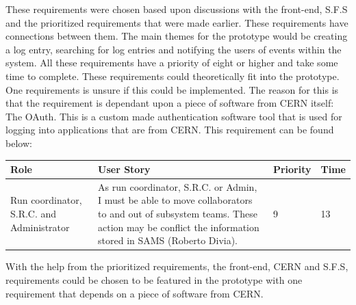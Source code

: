 \documentclass[paper=a4, fontsize=11pt,twoside]{scrartcl}	%
\begin{document}
These requirements were chosen based upon discussions with the front-end, S.F.S and the prioritized requirements that were made earlier. These requirements have connections between them. The main themes for the prototype would be creating a log entry, searching for log entries and notifying the users of events within the system. All these requirements have a priority of eight or higher and take some time to complete. These requirements could theoretically fit into the prototype. One requirements is unsure if this could be implemented. The reason for this is that the requirement is dependant upon a piece of software from CERN itself: The OAuth. This is a custom made authentication software tool that is used for logging into applications that are from CERN. This requirement can be found below: \\

\begin{longtable}{ | p{3cm} | p{8cm} | p{1.5cm} | l |}
\hline
Role & User Story & Priority & Time \\ \hline
Run coordinator, S.R.C. and Administrator &  As run coordinator, S.R.C. or Admin, I must be able to move collaborators to and out of subsystem teams. These action may be conflict the information stored in SAMS (Roberto Divia). & 9 & 13 \\ \hline
\end{longtable}

With the help from the prioritized requirements, the front-end, CERN and S.F.S, requirements could be chosen to be featured in the prototype with one requirement that depends on a piece of software from CERN.
\newpage
\end{document}
